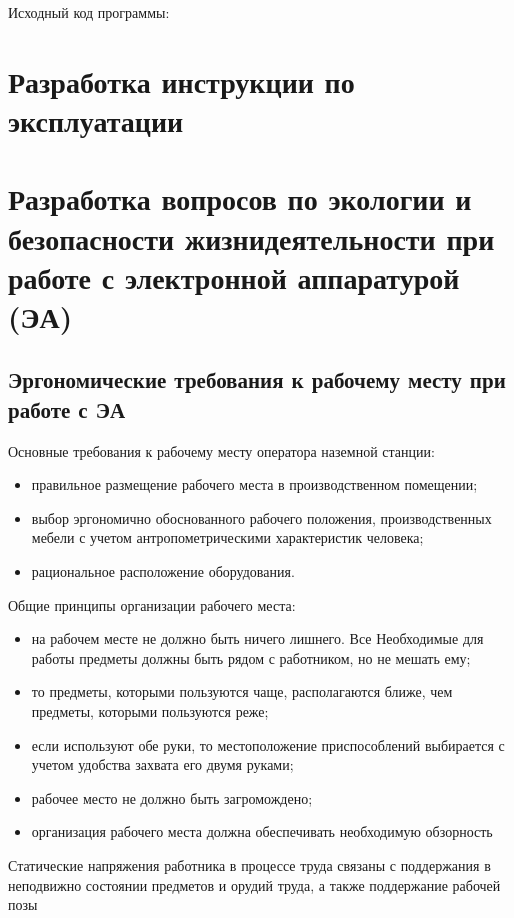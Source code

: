 \documentclass[a4paper,12pt]{report} %
\begin{document}
Исходный код программы:





\newpage
\chapter{Разработка инструкции по эксплуатации}
\newpage
\chapter{Разработка вопросов по экологии и безопасности жизнидеятельности при
  работе с электронной аппаратурой (ЭА)} %
\section{Эргономические требования к рабочему месту при работе с ЭА}
Основные требования к рабочему месту оператора наземной станции:

\begin{itemize}
\item правильное размещение рабочего места в производственном помещении; 
\item выбор эргономично обоснованного рабочего положения, производственных
  мебели с учетом антропометрическими характеристик человека; 
\item рациональное расположение оборудования. 
\end{itemize}

Общие принципы организации рабочего места:

\begin{itemize}
\item на рабочем месте не должно быть ничего лишнего. Все Необходимые для работы
  предметы должны быть рядом с работником, но не мешать ему; 
\item то предметы, которыми пользуются чаще, располагаются ближе, чем предметы,
  которыми пользуются реже; 
\item если используют обе руки, то местоположение приспособлений выбирается с
  учетом удобства захвата его двумя руками; 
\item рабочее место не должно быть загромождено; 
\item организация рабочего места должна обеспечивать необходимую обзорность 
\end{itemize}

Статические напряжения работника в процессе труда связаны с поддержания в
неподвижно состоянии предметов и орудий труда, а также поддержание рабочей позы 
\end{document}
